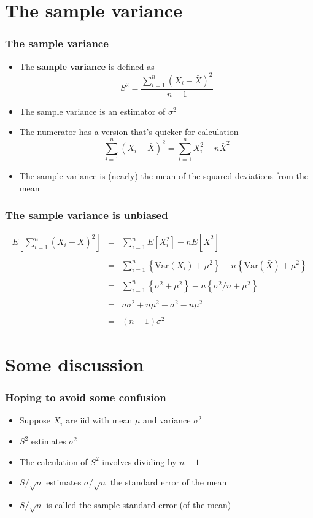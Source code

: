 \documentclass[aspectratio=169]{beamer}
\newcommand{\Var}{\mathrm{Var}}
\begin{document}
\section{The sample variance}
\begin{frame}\frametitle{The sample variance}
  \begin{itemize}
  \item The {\bf sample variance} is defined as 
    $$
    S^2 =   \frac{\sum_{i=1}^n (X_i - \bar X)^2}{n-1} 
    $$
  \item The sample variance is an estimator of $\sigma^2$
  \item The numerator has a version that's quicker for calculation
    $$
    \sum_{i=1}^n (X_i - \bar X)^2 = \sum_{i=1}^n X_i^2 - n \bar X^2
    $$
  \item The sample variance is (nearly) the mean of the squared deviations from the mean
  \end{itemize}
\end{frame}

\begin{frame}\frametitle{The sample variance is unbiased}
  \begin{eqnarray*}
    E\left[\sum_{i=1}^n (X_i - \bar X)^2\right] & = & \sum_{i=1}^n E\left[X_i^2\right] - n E\left[\bar X^2\right] \\ \\
    & = & \sum_{i=1}^n \left\{\Var(X_i) + \mu^2\right\} - n \left\{\Var(\bar X) + \mu^2\right\} \\ \\
    & = & \sum_{i=1}^n \left\{\sigma^2 + \mu^2\right\} - n \left\{\sigma^2 / n + \mu^2\right\} \\ \\
    & = & n \sigma^2 + n \mu ^ 2 - \sigma^2 - n \mu^2 \\ \\
    & = & (n - 1) \sigma^2
  \end{eqnarray*}
\end{frame}

\section{Some discussion}
\begin{frame}\frametitle{Hoping to avoid some confusion}
  \begin{itemize}
  \item Suppose $X_i$ are iid with mean $\mu$ and variance $\sigma^2$
  \item $S^2$ estimates $\sigma^2$
  \item The calculation of $S^2$ involves dividing by $n-1$
  \item $S / \sqrt{n}$ estimates $\sigma / \sqrt{n}$ the standard error of the mean
  \item $S / \sqrt{n}$ is called the sample standard error (of the mean)
  \end{itemize}
\end{frame} 
\end{document}
